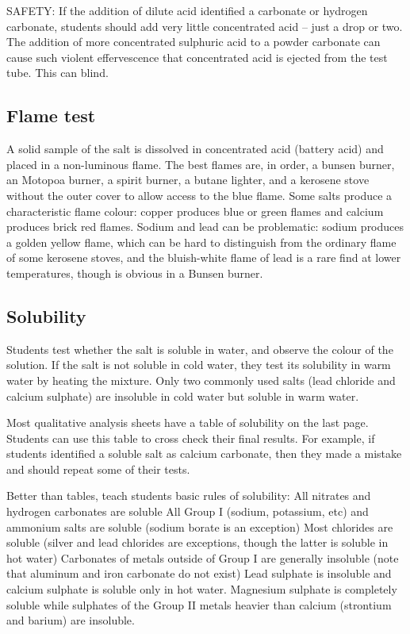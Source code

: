 SAFETY: If the addition of dilute acid identified 
a carbonate or hydrogen carbonate, 
students should add very little concentrated acid -- 
just a drop or two. 
The addition of more concentrated sulphuric acid 
to a powder carbonate can cause such violent effervescence 
that concentrated acid is ejected from the test tube. 
This can blind.

\subsection{Flame test}
A solid sample of the salt is dissolved in concentrated acid (battery acid) and placed in a non-luminous flame. 
The best flames are, 
in order, 
a bunsen burner, 
an Motopoa burner,
a spirit burner, 
a butane lighter, 
and a kerosene stove without the outer cover 
to allow access to the blue flame. 
Some salts produce a characteristic flame colour: 
copper produces blue or green flames and calcium produces brick red flames. 
Sodium and lead can be problematic: sodium produces a golden yellow flame, 
which can be hard to distinguish 
from the ordinary flame of some kerosene stoves, 
and the bluish-white flame of lead is a rare find at lower temperatures, 
though is obvious in a Bunsen burner.

\subsection{Solubility}
Students test whether the salt is soluble in water, 
and observe the colour of the solution. 
If the salt is not soluble in cold water, 
they test its solubility in warm water by heating the mixture. 
Only two commonly used salts 
(lead chloride and calcium sulphate) are insoluble in cold water 
but soluble in warm water. 

Most qualitative analysis sheets have a table of solubility on the last page. 
Students can use this table to cross check their final results. 
For example, 
if students identified a soluble salt as calcium carbonate, 
then they made a mistake and should repeat some of their tests.

Better than tables, 
teach students basic rules of solubility:
All nitrates and hydrogen carbonates are soluble
All Group I (sodium, 
potassium, 
etc) and ammonium salts are soluble (sodium borate is an exception)
Most chlorides are soluble (silver and lead chlorides are exceptions, 
though the latter is soluble in hot water)
Carbonates of metals outside of Group I are generally insoluble 
(note that aluminum and iron carbonate do not exist)
Lead sulphate is insoluble and calcium sulphate is soluble only in hot water. 
Magnesium sulphate is completely soluble 
while sulphates of the Group II metals heavier than calcium 
(strontium and barium) are insoluble.

